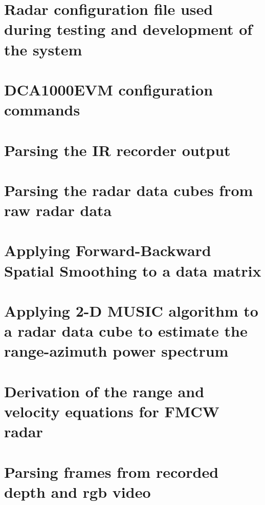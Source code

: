 \documentclass[english, numeric, fleqn, draft]{tauthesis}
\begin{document}
\begin{appendices}

\chapter{Radar configuration file used during testing and development of the system}
\label{app:config}


\chapter{DCA1000EVM configuration commands}
\label{app:dca1000evm-commands}


\chapter{Parsing the IR recorder output}
\label{app:ir-parsing}


\chapter{Parsing the radar data cubes from raw radar data}
\label{app:get_frames}


\chapter{Applying Forward-Backward Spatial Smoothing to a data matrix}
\label{app:fbss-algorithm}


\chapter{Applying 2-D MUSIC algorithm to a radar data cube to estimate the range-azimuth power spectrum}
\label{app:2d-music-algorithm}


\chapter{Derivation of the range and velocity equations for FMCW radar}
\label{app:deriving-range-velocity-fft}


\chapter{Parsing frames from recorded depth and rgb video}
\label{app:image-parsing}


\label{app:mic-parsing}


\end{appendices}
\end{document}
